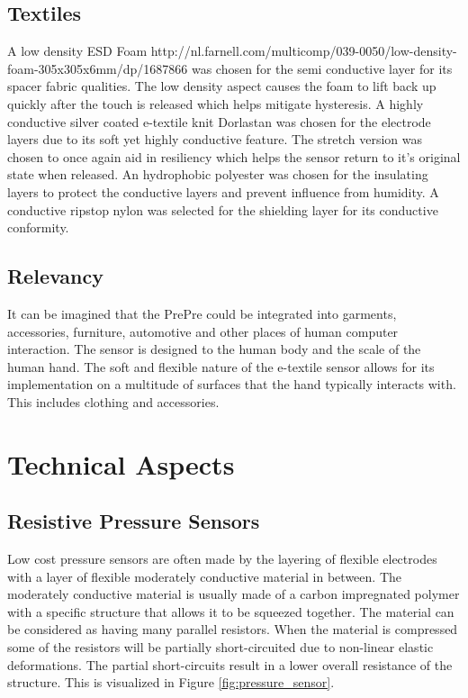 \documentclass{sigchi-ext}
\begin{document}
\subsection{Textiles}
A low density ESD Foam http://nl.farnell.com/multicomp/039-0050/low-density-foam-305x305x6mm/dp/1687866 was chosen for the semi conductive layer for its spacer fabric qualities.  The low density aspect causes the foam to lift back up quickly after the touch is released which helps mitigate hysteresis. A highly conductive silver coated e-textile knit Dorlastan was chosen for the electrode layers due to its soft yet highly conductive feature. The stretch version was chosen to once again aid in resiliency which helps the sensor return to it's original state when released.  An hydrophobic polyester was chosen for the insulating layers to protect the conductive layers and prevent influence from humidity.  A conductive ripstop nylon was selected for the shielding layer for its conductive conformity.  
\subsection{Relevancy}
It can be imagined that the PrePre could be integrated into garments, accessories, furniture, automotive and other places of human computer interaction.  The sensor is designed to the human body and the scale of the human hand.  The soft and flexible nature of the e-textile sensor allows for its implementation on a multitude of surfaces that the hand typically interacts with.  This includes clothing and accessories. 

\section{Technical Aspects}
\subsection{Resistive Pressure Sensors}
Low cost pressure sensors are often made by the layering of flexible electrodes
with a layer of flexible moderately conductive material in between. The
moderately conductive material is usually made of a carbon impregnated polymer
with a specific structure that allows it to be squeezed together. The material
can be considered as having many parallel resistors. When the material is
compressed some of the resistors will be partially short-circuited due to
non-linear elastic deformations. The partial short-circuits result in a lower
overall resistance of the structure. This is visualized
in Figure \ref{fig:pressure_sensor}.
\end{document}
